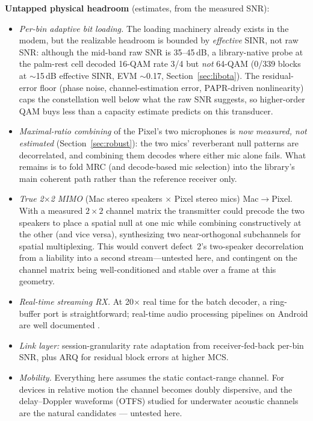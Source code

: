 \documentclass[11pt]{article}
\begin{document}
\textbf{Untapped physical headroom} (estimates, from the measured SNR):
\begin{itemize}
  \item \emph{Per-bin adaptive bit loading.} The loading machinery already
        exists in the modem, but the realizable headroom is bounded by
        \emph{effective} SINR, not raw SNR: although the mid-band raw SNR is
        35--45\,dB, a library-native probe at the palm-rest cell decoded 16-QAM
        rate 3/4 but \emph{not} 64-QAM (0/339 blocks at $\sim$15\,dB effective
        SINR, EVM $\sim$0.17, Section~\ref{sec:libota}). The residual-error floor
        (phase noise, channel-estimation error, PAPR-driven nonlinearity) caps
        the constellation well below what the raw SNR suggests, so higher-order
        QAM buys less than a capacity estimate predicts on this transducer.
  \item \emph{Maximal-ratio combining} of the Pixel's two microphones is
        \emph{now measured, not estimated} (Section~\ref{sec:robust}): the two
        mics' reverberant null patterns are decorrelated, and combining them
        decodes where either mic alone fails. What remains is to fold MRC (and
        decode-based mic selection) into the library's main coherent path rather
        than the reference receiver only.
  \item \emph{True 2$\times$2 MIMO} (Mac stereo speakers $\times$ Pixel stereo
        mics) Mac$\rightarrow$Pixel. With a measured $2\times2$ channel matrix
        the transmitter could precode the two speakers to place a spatial null at
        one mic while combining constructively at the other (and vice versa),
        synthesizing two near-orthogonal subchannels for spatial multiplexing.
        This would convert defect~2's two-speaker decorrelation from a liability
        into a second stream---untested here, and contingent on the channel
        matrix being well-conditioned and stable over a frame at this geometry.
  \item \emph{Real-time streaming RX.} At 20$\times$ real time for the batch
        decoder, a ring-buffer port is straightforward; real-time audio
        processing pipelines on Android are well documented \cite{rtdroid}.
  \item \emph{Link layer:} session-granularity rate adaptation from
        receiver-fed-back per-bin SNR, plus ARQ for residual block errors at
        higher MCS.
  \item \emph{Mobility.} Everything here assumes the static contact-range
        channel. For devices in relative motion the channel becomes doubly
        dispersive, and the delay--Doppler waveforms (OTFS) studied for
        underwater acoustic channels \cite{otfsreview,otfsjasa} are the
        natural candidates --- untested here.
\end{itemize}
\end{document}

